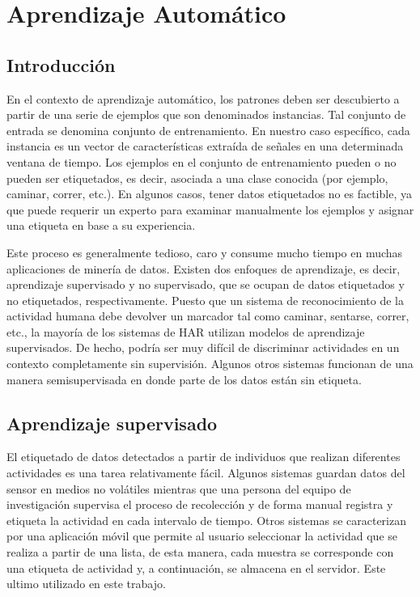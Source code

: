 
\chapter{Aprendizaje Automático}
\label{chap3:Aprendizaje-Automatico}

\section{Introducción}
En el contexto de aprendizaje automático, los patrones deben ser descubierto a partir de una serie de ejemplos que son denominados instancias. Tal conjunto de entrada se denomina conjunto de entrenamiento. En nuestro caso específico, cada instancia es un vector de características extraída de señales en una determinada ventana de tiempo. Los ejemplos en el conjunto de entrenamiento pueden o no pueden ser etiquetados, es decir, asociada a una clase conocida (por ejemplo, caminar, correr, etc.). En algunos casos, tener datos etiquetados no es factible, ya que puede requerir un experto para examinar manualmente los ejemplos y asignar una etiqueta en base a su experiencia.

Este proceso es generalmente tedioso, caro y consume mucho tiempo en muchas aplicaciones de minería de datos. Existen dos enfoques de aprendizaje, es decir, aprendizaje supervisado y no supervisado, que se ocupan de datos etiquetados y no etiquetados, respectivamente. Puesto que un sistema de reconocimiento de la actividad humana debe devolver un marcador tal como caminar, sentarse, correr, etc., la mayoría de los sistemas de HAR utilizan modelos de aprendizaje supervisados. De hecho, podría ser muy difícil de discriminar actividades en un contexto completamente sin supervisión. Algunos otros sistemas funcionan de una manera semisupervisada en donde parte de los datos están sin etiqueta.

\section{Aprendizaje supervisado}
El etiquetado de datos detectados a partir de individuos que realizan diferentes actividades es una tarea relativamente fácil.
Algunos sistemas guardan datos del sensor en medios no volátiles mientras que una persona del equipo de investigación supervisa el proceso de recolección y de forma manual registra y etiqueta la actividad en cada intervalo de tiempo. Otros sistemas se caracterizan por una aplicación móvil que permite al usuario seleccionar la actividad que se realiza a partir de una lista, de esta manera, cada muestra se corresponde con una etiqueta de actividad y, a continuación, se almacena en el servidor. Este ultimo utilizado en este trabajo.

